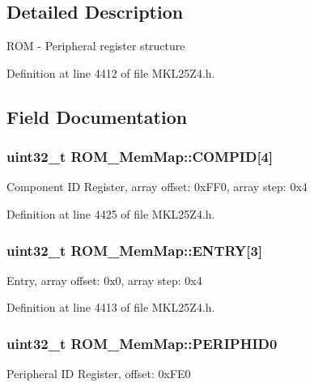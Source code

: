 \subsection{Detailed Description}
R\+OM -\/ Peripheral register structure 

Definition at line 4412 of file M\+K\+L25\+Z4.\+h.



\subsection{Field Documentation}
\subsubsection[{\texorpdfstring{C\+O\+M\+P\+ID}{COMPID}}]{\setlength{\rightskip}{0pt plus 5cm}uint32\+\_\+t R\+O\+M\+\_\+\+Mem\+Map\+::\+C\+O\+M\+P\+ID\mbox{[}4\mbox{]}}\hypertarget{struct_r_o_m___mem_map_a767dbeb1dc65d81e85c679c91268f2d0}{}\label{struct_r_o_m___mem_map_a767dbeb1dc65d81e85c679c91268f2d0}
Component ID Register, array offset\+: 0x\+F\+F0, array step\+: 0x4 

Definition at line 4425 of file M\+K\+L25\+Z4.\+h.

\subsubsection[{\texorpdfstring{E\+N\+T\+RY}{ENTRY}}]{\setlength{\rightskip}{0pt plus 5cm}uint32\+\_\+t R\+O\+M\+\_\+\+Mem\+Map\+::\+E\+N\+T\+RY\mbox{[}3\mbox{]}}\hypertarget{struct_r_o_m___mem_map_ae744813808d96459e3920bade61dcc96}{}\label{struct_r_o_m___mem_map_ae744813808d96459e3920bade61dcc96}
Entry, array offset\+: 0x0, array step\+: 0x4 

Definition at line 4413 of file M\+K\+L25\+Z4.\+h.

\subsubsection[{\texorpdfstring{P\+E\+R\+I\+P\+H\+I\+D0}{PERIPHID0}}]{\setlength{\rightskip}{0pt plus 5cm}uint32\+\_\+t R\+O\+M\+\_\+\+Mem\+Map\+::\+P\+E\+R\+I\+P\+H\+I\+D0}\hypertarget{struct_r_o_m___mem_map_ace4dd72e12e50c9ae1e3af145ed542ba}{}\label{struct_r_o_m___mem_map_ace4dd72e12e50c9ae1e3af145ed542ba}
Peripheral ID Register, offset\+: 0x\+F\+E0 

